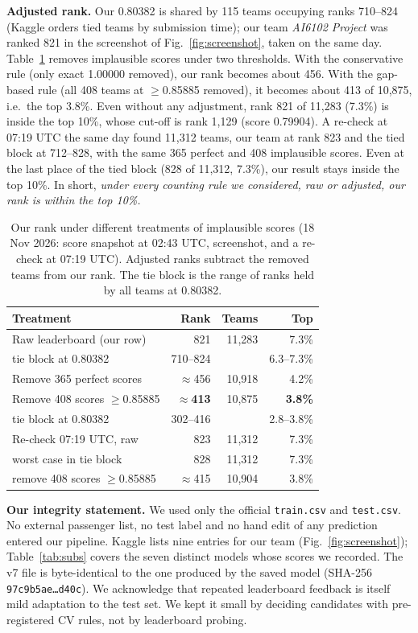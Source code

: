 \documentclass[10pt,twocolumn,letterpaper]{article}
\begin{document}
\textbf{Adjusted rank.} Our 0.80382 is shared by 115 teams occupying ranks 710--824 (Kaggle orders tied teams by submission time); our team \emph{AI6102 Project} was ranked 821 in the screenshot of Fig.~\ref{fig:screenshot}, taken on the same day. Table~\ref{tab:rank} removes implausible scores under two thresholds. With the conservative rule (only exact 1.00000 removed), our rank becomes about 456. With the gap-based rule (all 408 teams at $\geq$0.85885 removed), it becomes about 413 of 10{,}875, i.e.\ the top 3.8\%. Even without any adjustment, rank 821 of 11{,}283 (7.3\%) is inside the top 10\%, whose cut-off is rank 1{,}129 (score 0.79904). A re-check at 07:19 UTC the same day found 11{,}312 teams, our team at rank 823 and the tied block at 712--828, with the same 365 perfect and 408 implausible scores. Even at the last place of the tied block (828 of 11{,}312, 7.3\%), our result stays inside the top 10\%. In short, \emph{under every counting rule we considered, raw or adjusted, our rank is within the top 10\%.}

\begin{table}[t]
\centering\small
\caption{Our rank under different treatments of implausible scores (18 Nov 2026: score snapshot at 02:43 UTC, screenshot, and a re-check at 07:19 UTC). Adjusted ranks subtract the removed teams from our rank. The tie block is the range of ranks held by all teams at 0.80382.}
\label{tab:rank}
\begin{tabular}{lrrr}
\toprule
Treatment & Rank & Teams & Top\\
\midrule
Raw leaderboard (our row) & 821 & 11{,}283 & 7.3\%\\
\quad tie block at 0.80382 & 710--824 & & 6.3--7.3\%\\
Remove 365 perfect scores & $\approx$456 & 10{,}918 & 4.2\%\\
\rowcolor{blue!6}Remove 408 scores $\geq$0.85885 & $\approx$\textbf{413} & 10{,}875 & \textbf{3.8\%}\\
\quad tie block at 0.80382 & 302--416 & & 2.8--3.8\%\\
\midrule
Re-check 07:19 UTC, raw & 823 & 11{,}312 & 7.3\%\\
\quad worst case in tie block & 828 & 11{,}312 & 7.3\%\\
\quad remove 408 scores $\geq$0.85885 & $\approx$415 & 10{,}904 & 3.8\%\\
\bottomrule
\end{tabular}
\end{table}

\textbf{Our integrity statement.} We used only the official \texttt{train.csv} and \texttt{test.csv}. No external passenger list, no test label and no hand edit of any prediction entered our pipeline. Kaggle lists nine entries for our team (Fig.~\ref{fig:screenshot}); Table~\ref{tab:subs} covers the seven distinct models whose scores we recorded. The v7 file is byte-identical to the one produced by the saved model (SHA-256 \texttt{97c9b5ae\ldots d40c}). We acknowledge that repeated leaderboard feedback is itself mild adaptation to the test set. We kept it small by deciding candidates with pre-registered CV rules, not by leaderboard probing.
\end{document}

